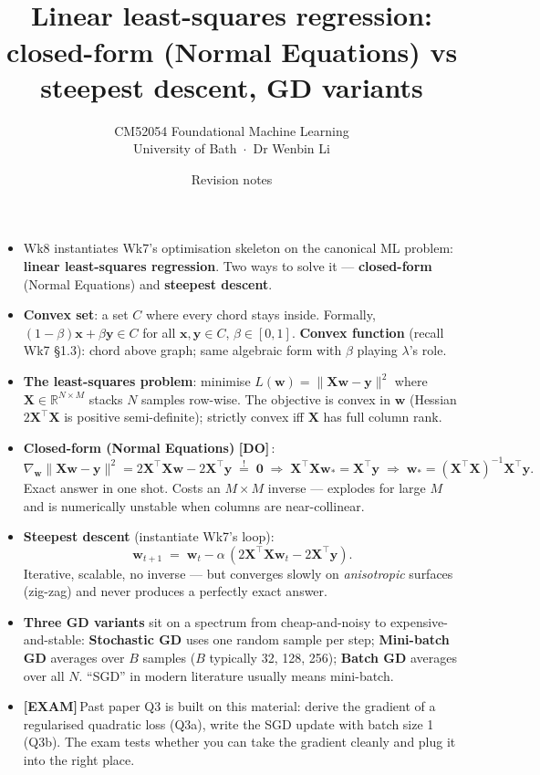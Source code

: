 \documentclass[11pt, a4paper]{article}
\title{\vspace{-1cm}{\Huge\bfseries Week 8 — Optimisation Basics 2} \\[0.4em]{\large Linear least-squares regression: closed-form (Normal Equations) vs steepest descent, GD variants}}
\author{\large CM52054 Foundational Machine Learning \\[0.2em]\normalsize University of Bath \,$\cdot$\, Dr Wenbin Li}
\date{Revision notes}
\newcommand{\examflag}{\textcolor{tipBd}{\textbf{[EXAM]}}\,}
\newcommand{\doflag}{\textcolor{defBd}{\textbf{[DO]}}\,}
\begin{document}
\maketitle
\thispagestyle{empty}

\vspace{1em}

\begin{tldrbox}
\begin{itemize}[leftmargin=*]
  \item Wk8 instantiates Wk7's optimisation skeleton on the canonical ML problem: \textbf{linear least-squares regression}. Two ways to solve it — \textbf{closed-form} (Normal Equations) and \textbf{steepest descent}.
  \item \textbf{Convex set}: a set $C$ where every chord stays inside. Formally, $(1-\beta)\mathbf{x}+\beta\mathbf{y}\in C$ for all $\mathbf{x},\mathbf{y}\in C$, $\beta\in[0,1]$. \textbf{Convex function} (recall Wk7 §1.3): chord above graph; same algebraic form with $\beta$ playing $\lambda$'s role.
  \item \textbf{The least-squares problem}: minimise $L(\mathbf{w}) = \|\mathbf{X}\mathbf{w}-\mathbf{y}\|^2$ where $\mathbf{X}\in\mathbb{R}^{N\times M}$ stacks $N$ samples row-wise. The objective is convex in $\mathbf{w}$ (Hessian $2\mathbf{X}^\top\mathbf{X}$ is positive semi-definite); strictly convex iff $\mathbf{X}$ has full column rank.
  \item \textbf{Closed-form (Normal Equations)} \doflag{}:
  \[
  \nabla_\mathbf{w}\|\mathbf{X}\mathbf{w}-\mathbf{y}\|^2 = 2\mathbf{X}^\top\mathbf{X}\mathbf{w}-2\mathbf{X}^\top\mathbf{y} \;\stackrel{!}{=}\; \mathbf{0}
  \;\Longrightarrow\; \mathbf{X}^\top\mathbf{X}\mathbf{w}_* = \mathbf{X}^\top\mathbf{y}
  \;\Longrightarrow\; \mathbf{w}_* = (\mathbf{X}^\top\mathbf{X})^{-1}\mathbf{X}^\top\mathbf{y}.
  \]
  Exact answer in one shot. Costs an $M\times M$ inverse — explodes for large $M$ and is numerically unstable when columns are near-collinear.
  \item \textbf{Steepest descent} (instantiate Wk7's loop):
  \[
  \mathbf{w}_{t+1} \;=\; \mathbf{w}_t - \alpha\,(2\mathbf{X}^\top\mathbf{X}\mathbf{w}_t - 2\mathbf{X}^\top\mathbf{y}).
  \]
  Iterative, scalable, no inverse — but converges slowly on \emph{anisotropic} surfaces (zig-zag) and never produces a perfectly exact answer.
  \item \textbf{Three GD variants} sit on a spectrum from cheap-and-noisy to expensive-and-stable: \textbf{Stochastic GD} uses one random sample per step; \textbf{Mini-batch GD} averages over $B$ samples ($B$ typically 32, 128, 256); \textbf{Batch GD} averages over all $N$. ``SGD'' in modern literature usually means mini-batch.
  \item \examflag{}Past paper Q3 is built on this material: derive the gradient of a regularised quadratic loss (Q3a), write the SGD update with batch size 1 (Q3b). The exam tests whether you can take the gradient cleanly and plug it into the right place.
\end{itemize}
\end{tldrbox}
\end{document}
